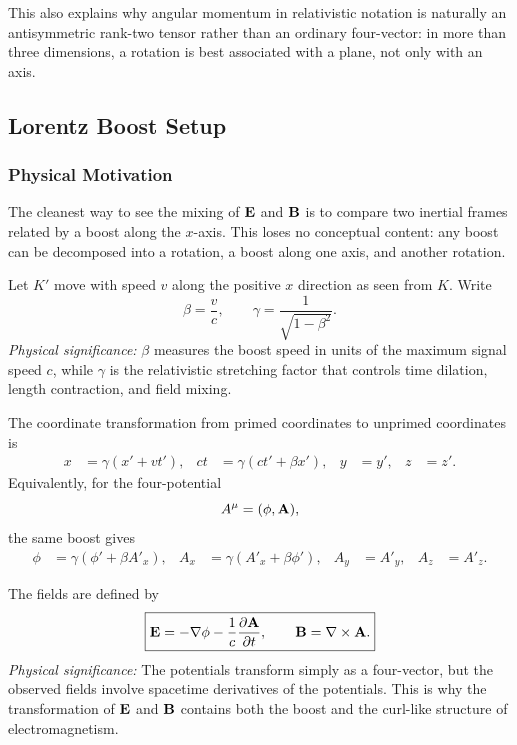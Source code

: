 This also explains why angular momentum in relativistic notation is naturally an
antisymmetric rank-two tensor rather than an ordinary four-vector: in more than
three dimensions, a rotation is best associated with a plane, not only with an axis.

\subsection{Lorentz Boost Setup}\label{subsec:lec11-boost-setup}

\subsubsection*{Physical Motivation}
The cleanest way to see the mixing of $\mathbf{E}$ and $\mathbf{B}$ is to compare two inertial
frames related by a boost along the $x$-axis.  This loses no conceptual content:
any boost can be decomposed into a rotation, a boost along one axis, and another
rotation.

Let $K'$ move with speed $v$ along the positive $x$ direction as seen from $K$.
Write
\begin{equation}\label{eq:lec11-beta-gamma}
  \boxed{
  \beta=\frac{v}{c},\qquad
  \gamma=\frac{1}{\sqrt{1-\beta^2}} .
  }
\end{equation}
\textit{Physical significance:} $\beta$ measures the boost speed in units of the
maximum signal speed $c$, while $\gamma$ is the relativistic stretching factor that
controls time dilation, length contraction, and field mixing.

The coordinate transformation from primed coordinates to unprimed coordinates is
\begin{align}
  x &= \gamma(x'+v t'), &
  ct &= \gamma(ct'+\beta x'), &
  y&=y', &
  z&=z'.
  \label{eq:lec11-lorentz-coordinates}
\end{align}
Equivalently, for the four-potential
\begin{equation}\label{eq:lec11-four-potential}
  A^\mu=(\phi,\mathbf{A}),
\end{equation}
the same boost gives
\begin{align}
  \phi &= \gamma(\phi' + \beta A'_x),&
  A_x &= \gamma(A'_x+\beta\phi'),&
  A_y &= A'_y,&
  A_z &= A'_z .
  \label{eq:lec11-potential-transform}
\end{align}

The fields are defined by
\begin{equation}\label{eq:lec11-fields-potentials}
  \boxed{
  \mathbf{E} = -\nabla\phi-\frac{1}{c}\pdv{\mathbf{A}}{t},
  \qquad
  \mathbf{B} = \nabla\times\mathbf{A} .
  }
\end{equation}
\textit{Physical significance:} The potentials transform simply as a four-vector,
but the observed fields involve spacetime derivatives of the potentials.  This is
why the transformation of $\mathbf{E}$ and $\mathbf{B}$ contains both the boost and the curl-like
structure of electromagnetism.

